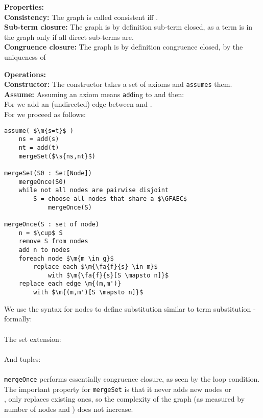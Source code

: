 \bigskip
\noindent
\textbf{Properties:}\\
\textbf{Consistency:} The graph is called consistent iff .\\
\textbf{Sub-term closure:} The graph is by definition sub-term closed, as a term is in the graph only if all direct sub-terms are.\\
\textbf{Congruence closure:} The graph is by definition congruence closed, by the uniqueness of \GFAECs{}

\bigskip
\noindent
\textbf{Operations:}\\
\textbf{Constructor:} The constructor takes a set of axioms and \lstinline{assumes} them.\\
\textbf{Assume:} Assuming an axiom  means \lstinline{add}ing  to  and then:\\
For  we add an (undirected) edge between  and . \\
For  we proceed as follows:
\begin{lstlisting}
assume( $\m{s=t}$ )
	ns = add(s)
	nt = add(t)
	mergeSet($\s{ns,nt}$)
	
mergeSet(S0 : Set[Node])
	mergeOnce(S0)
	while not all nodes are pairwise disjoint
		S = choose all nodes that share a $\GFAEC$
			mergeOnce(S)
	
mergeOnce(S : set of node)
	n = $\cup$ S 
	remove S from nodes
	add n to nodes
	foreach node $\m{m \in g}$
		replace each $\m{\fa{f}{s} \in m}$
			with $\m{\fa{f}{s}[S \mapsto n]}$
	replace each edge \m{(m,m')}
		with $\m{(m,m')[S \mapsto n]}$
\end{lstlisting}
We use the syntax 
for nodes  to define substitution similar to term substitution - formally:\\
\\
The set extension:\\
\\
And tuples:\\
\\
\lstinline{mergeOnce} performs essentially congruence closure, as seen by the loop condition.\\
The important property for \lstinline{mergeSet} is that it never adds new nodes or \\
\GFAECs{}, 
only replaces existing ones, so the complexity of the graph (as measured by number of nodes and \GFAECs{}) does not increase.\\
